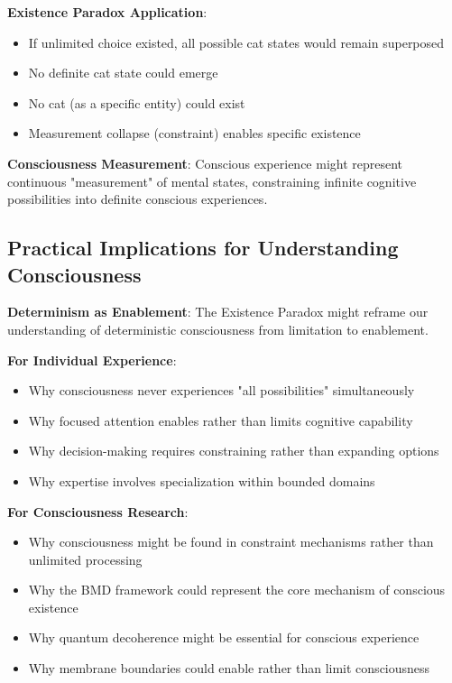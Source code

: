 \documentclass[12pt]{article}
\begin{document}
\textbf{Existence Paradox Application}:
\begin{itemize}
\item If unlimited choice existed, all possible cat states would remain superposed
\item No definite cat state could emerge
\item No cat (as a specific entity) could exist
\item Measurement collapse (constraint) enables specific existence
\end{itemize}

\textbf{Consciousness Measurement}: Conscious experience might represent continuous "measurement" of mental states, constraining infinite cognitive possibilities into definite conscious experiences.

\subsection{Practical Implications for Understanding Consciousness}

\textbf{Determinism as Enablement}: The Existence Paradox might reframe our understanding of deterministic consciousness from limitation to enablement.

\textbf{For Individual Experience}:
\begin{itemize}
\item Why consciousness never experiences "all possibilities" simultaneously
\item Why focused attention enables rather than limits cognitive capability
\item Why decision-making requires constraining rather than expanding options
\item Why expertise involves specialization within bounded domains
\end{itemize}

\textbf{For Consciousness Research}:
\begin{itemize}
\item Why consciousness might be found in constraint mechanisms rather than unlimited processing
\item Why the BMD framework could represent the core mechanism of conscious existence
\item Why quantum decoherence might be essential for conscious experience
\item Why membrane boundaries could enable rather than limit consciousness
\end{itemize}
\end{document}
